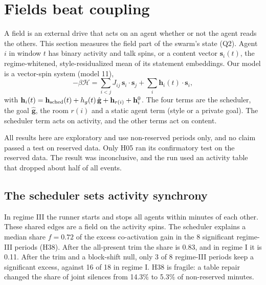 \section{Fields beat coupling}
\label{sec:fields}

A field is an external drive that acts on an agent whether or not the agent reads the others. This section measures the field part of the swarm's state (Q2). Agent $i$ in window $t$ has binary activity and talk spins, or a content vector $\mathbf s_i(t)$, the regime-whitened, style-residualized mean of its statement embeddings. Our model is a vector-spin system (model 11),
\begin{equation}
-\beta\mathcal H=\sum_{i<j}J_{ij}\,\mathbf s_i\cdot\mathbf s_j+\sum_i\mathbf h_i(t)\cdot\mathbf s_i ,
\label{eq:fields-H}
\end{equation}
with $\mathbf h_i(t)=\mathbf h_{\rm sched}(t)+h_g(t)\,\hat{\mathbf g}+\mathbf h_{r(i)}+\mathbf h_i^{0}$. The four terms are the scheduler, the goal $\hat{\mathbf g}$, the room $r(i)$ and a static agent term (style or a private goal). The scheduler term acts on activity, and the other terms act on content.

All results here are exploratory and use non-reserved periods only, and no claim passed a test on reserved data. Only H05 ran its confirmatory test on the reserved data. The result was inconclusive, and the run used an activity table that dropped about half of all events.

\subsection{The scheduler sets activity synchrony}

In regime III the runner starts and stops all agents within minutes of each other. These shared edges are a field on the activity spins. The scheduler explains a median share $f=0.72$ of the excess co-activation gain in the 8 significant regime-III periods (H38). After the all-present trim the share is 0.83, and in regime I it is 0.11. After the trim and a block-shift null, only 3 of 8 regime-III periods keep a significant excess, against 16 of 18 in regime I. H38 is fragile: a table repair changed the share of joint silences from 14.3\% to 5.3\% of non-reserved minutes.

